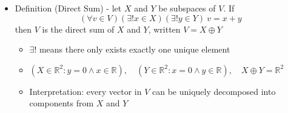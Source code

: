\documentclass{article}
\begin{document}
\begin{itemize}
\begin{itemize}
        \item Also $(Z \in \mathbb{R}^2 : y=x)$ is complement of $X$ and $Y$
    \end{itemize}
    \item Definition (Direct Sum) - let $X$ and $Y$ be subspaces of $V$. If
    \[
    (\forall v \in V)(\exists !x \in X)(\exists !y \in Y) \ v = x+y
    \]
    then $V$ is the direct sum of $X$ and $Y$, written $V = X \oplus Y$
    \begin{itemize}
        \item $\exists!$ means there only exists exactly one unique element
        \item $(X \in \mathbb{R}^2 : y=0 \wedge x \in \mathbb{R}), \quad (Y \in \mathbb{R}^2 : x = 0 \wedge y \in \mathbb{R}), \quad X \oplus Y = \mathbb{R}^2$
        \item Interpretation: every vector in $V$ can be uniquely decomposed into components from $X$ and $Y$
    \end{itemize}
    

\end{itemize}
\end{document}
